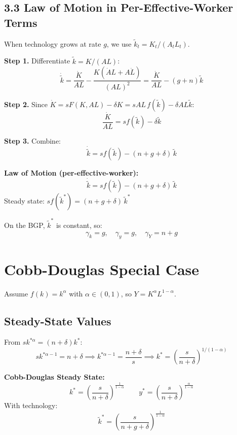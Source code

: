 \documentclass[a4paper,11pt]{article}
\newcommand{\ktilde}{\tilde{k}}
\begin{document}
\subsection*{3.3 Law of Motion in Per-Effective-Worker Terms}

When technology grows at rate $g$, we use $\ktilde_t = K_t/(A_t L_t)$.

\begin{derivationbox}
\textbf{Step 1.} Differentiate $\ktilde = K/(AL)$:
\[
\dot{\ktilde} = \frac{\dot{K}}{AL} - \frac{K(\dot{A}L + A\dot{L})}{(AL)^2} = \frac{\dot{K}}{AL} - (g+n)\ktilde
\]

\textbf{Step 2.} Since $\dot{K} = sF(K,AL) - \delta K = sAL\,f(\ktilde) - \delta AL\ktilde$:
\[
\frac{\dot{K}}{AL} = sf(\ktilde) - \delta\ktilde
\]

\textbf{Step 3.} Combine:
\[
\dot{\ktilde} = sf(\ktilde) - (n + g + \delta)\,\ktilde
\]
\end{derivationbox}

\begin{resultbox}
\textbf{Law of Motion (per-effective-worker):}
\[
\boxed{\dot{\ktilde} = sf(\ktilde) - (n+g+\delta)\,\ktilde}
\]
Steady state: $sf(\ktilde^*) = (n+g+\delta)\,\ktilde^*$
\end{resultbox}

On the BGP, $\ktilde^*$ is constant, so:
\[
\gamma_k = g, \quad \gamma_y = g, \quad \gamma_Y = n+g
\]

\section{Cobb-Douglas Special Case}

Assume $f(k) = k^\alpha$ with $\alpha \in (0,1)$, so $Y = K^\alpha L^{1-\alpha}$.

\subsection*{Steady-State Values}

\begin{derivationbox}
From $sk^{*\alpha} = (n+\delta)k^*$:
\[
s k^{*\alpha - 1} = n+\delta \implies k^{*\alpha-1} = \frac{n+\delta}{s}
\implies k^* = \left(\frac{s}{n+\delta}\right)^{1/(1-\alpha)}
\]
\end{derivationbox}

\begin{resultbox}
\textbf{Cobb-Douglas Steady State:}
\[
\boxed{k^* = \left(\frac{s}{n+\delta}\right)^{\!\frac{1}{1-\alpha}}}
\qquad
y^* = \left(\frac{s}{n+\delta}\right)^{\!\frac{\alpha}{1-\alpha}}
\]
With technology:
\[
\ktilde^* = \left(\frac{s}{n+g+\delta}\right)^{\!\frac{1}{1-\alpha}}
\]
\end{resultbox}
\end{document}
